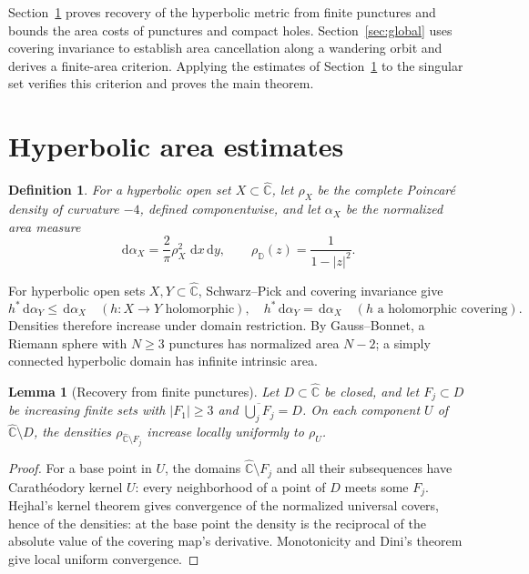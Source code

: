 \documentclass[10pt,a4paper]{amsart}
\newcommand{\D}{\mathbb D}
\newcommand{\sphere}{\widehat{\mathbb C}}
\newcommand{\dd}{\,\mathrm d}
\newtheorem{lemma}[theorem]{Lemma}
\newtheorem{definition}[theorem]{Definition}
\numberwithin{equation}{section}
\begin{document}
Section~\ref{sec:area} proves recovery of the hyperbolic metric from
finite punctures and bounds the area costs of punctures and compact
holes. Section~\ref{sec:global} uses covering invariance to establish
area cancellation along a wandering orbit and derives a finite-area
criterion. Applying the estimates of Section~\ref{sec:area} to the
singular set verifies this criterion and proves the main theorem.

\section{Hyperbolic area estimates}\label{sec:area}

\begin{definition}\label{def:area}
For a hyperbolic open set $X\subset\sphere$, let $\rho_X$ be the
complete Poincar\'e density of curvature $-4$, defined componentwise,
and let $\alpha_X$ be the normalized area measure
\[
 \dd\alpha_X=\frac2\pi\rho_X^2\,\dd x\dd y,
 \qquad \rho_\D(z)=\frac1{1-|z|^2}.
\]
\end{definition}

For hyperbolic open sets $X,Y\subset\sphere$, Schwarz--Pick and covering
invariance give
\[
 h^*\dd\alpha_Y\le\dd\alpha_X\quad(h:X\to Y\text{ holomorphic}),
 \quad h^*\dd\alpha_Y=\dd\alpha_X\quad(h\text{ a holomorphic covering}).
\]
Densities therefore increase under domain restriction. By Gauss--Bonnet,
a Riemann sphere with $N\ge3$ punctures has normalized area $N-2$; a simply
connected hyperbolic domain has infinite intrinsic area.

\begin{lemma}[Recovery from finite punctures]\label{core:kernel}
Let $D\subset\sphere$ be closed, and let $F_j\subset D$ be increasing
finite sets with $|F_1|\ge3$ and
$\overline{\bigcup_jF_j}=D$. On each component $U$ of
$\sphere\setminus D$, the densities $\rho_{\sphere\setminus F_j}$
increase locally uniformly to $\rho_U$.
\end{lemma}
\begin{proof}
For a base point in $U$, the domains $\sphere\setminus F_j$ and all
their subsequences have Carath\'eodory kernel $U$: every neighborhood of
a point of $D$ meets some $F_j$. Hejhal's kernel theorem
\cite[Theorem~1]{Hejhal} gives convergence of the normalized universal
covers, hence of the densities: at the base point the density is the
reciprocal of the absolute value of the covering map's derivative.
Monotonicity and Dini's theorem give local uniform convergence.
\end{proof}
\end{document}
